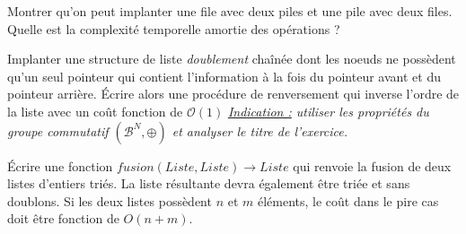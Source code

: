 \documentclass[../../../main.tex]{subfiles}
\begin{document}
 Montrer qu'on peut implanter une file avec deux piles et une pile avec deux files. Quelle est la complexité temporelle amortie des opérations ?

 Implanter une structure de liste \textit{doublement} chaînée dont les noeuds ne possèdent qu'un seul pointeur qui contient l'information à la fois du pointeur avant et du pointeur arrière. Écrire alors une procédure de renversement qui inverse l'ordre de la liste avec un coût fonction de $\mathcal{O}(1)$ \newline
\textit{\underline{Indication :} utiliser les propriétés du groupe commutatif $(\mathcal{B}^N, \oplus)$ et analyser le titre de l'exercice.}

 Écrire une fonction $fusion(Liste, Liste) \rightarrow Liste$ qui renvoie la fusion de deux listes d'entiers triés. La liste résultante devra également être triée et sans doublons. Si les deux listes possèdent $n$ et $m$ éléments, le coût dans le pire cas doit être fonction de $O(n + m)$.
\end{document}
